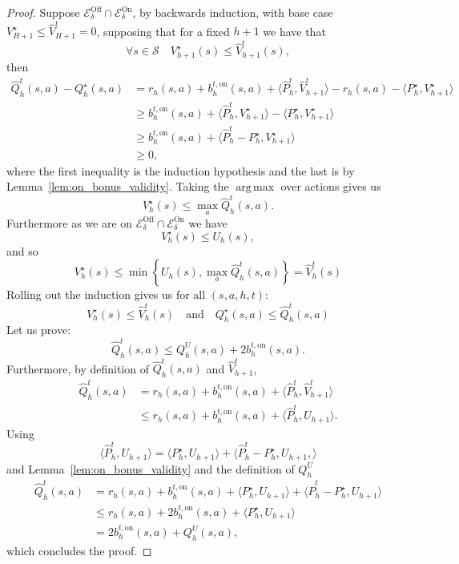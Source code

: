 \documentclass[twoside]{article}
\DeclareMathOperator*{\argmax}{arg\,max}
\newcommand{\on}{\mathrm{on}} %
\newcommand{\bont}{b_h^{t,\on}} %
\newcommand{\highv}{U} %
\begin{document}
\begin{proof}
    Suppose $\mathcal{E}^{\mathrm{Off}}_\delta\cap \mathcal{E}^{\mathrm{On}}_\delta$, by backwards induction, with base case $V_{H+1}^\star \le \widehat{V}_{H+1}^t = 0$, supposing that for a fixed $h+1$ we have that 
    \[
    \forall s \in \mathcal{S} \quad V_{h+1}^\star(s) \le \widehat{V}_{h+1}^t(s), 
    \]
    then 
    \begin{align*}
        \widehat{Q}^t_h(s,a) - Q^{\star}_h(s,a) & = r_h(s,a) + \bont(s,a) + \langle \widehat{P}^t_h, \widehat{V}^t_{h+1} \rangle - r_h(s,a) - \langle P^{\star}_h, V^{\star}_{h+1} \rangle \\
        & \geq  \bont(s,a) + \langle \widehat{P}^t_h, V^{\star}_{h+1}\rangle - \langle P^{\star}_h, V^{\star}_{h+1} \rangle \\
        & \geq \bont(s,a) +\langle \widehat{P}^t_h - P^{\star}_h, V^{\star}_{h+1}\rangle \\
        & \geq 0,
    \end{align*}
    where the first inequality is the induction hypothesis and the last is by Lemma~\ref{lem:on_bonus_validity}. Taking the $\argmax$ over actions gives us 
    \[ V^{\star}_h(s) \leq \max_a \widehat{Q}^t_h(s,a).\]
    Furthermore as we are on $\mathcal{E}^{\mathrm{Off}}_\delta\cap \mathcal{E}^{\mathrm{On}}_\delta$ we have 
    \[ V^{\star}_h(s) \leq \highv_{h}(s),\]
    and so 
    \[ V^{\star}_h(s) \leq  \min \left \lbrace \highv_{h}(s),\max_a  
    \widehat{Q}^t_h(s,a)\right \rbrace = \widehat{V}^t_h(s)\]
    Rolling out the induction gives us for all $(s,a,h,t)$:
    \[
    V_h^\star(s) \le \widehat{V}_h^t(s) \quad \text{and} \quad Q_h^\star(s,a) \le \widehat{Q}_h^t(s,a)
    \]
Let us prove: 
\[
\widehat{Q}_h^t(s,a) \le Q_h^{\highv}(s,a)+2 \bont(s,a).
\] 
Furthermore, by definition of $\widehat{Q}_h^t(s,a)$ and $\widehat{V}^t_{h+1}$,
\begin{align*}
    \widehat{Q}_h^t(s,a) & = r_h(s,a) + \bont(s,a) + \langle \widehat{P}^t_h , \widehat{V}^t_{h+1} \rangle \\
    & \leq  r_h(s,a) + \bont(s,a) + \langle \widehat{P}^t_h , \highv_{h+1} \rangle.
\end{align*}
Using 
\[\langle \widehat{P}^t_h , \highv_{h+1} \rangle = \langle P^{\star}_h , \highv_{h+1} \rangle + \langle \widehat{P}^t_h - P^{\star}_h , \highv_{h+1}, \rangle\] and Lemma~\ref{lem:on_bonus_validity} and the definition of $Q_h^{\highv}$
\begin{align*}
    \widehat{Q}_h^t(s,a) &= r_h(s,a) + \bont(s,a) + \langle P^{\star}_h , \highv_{h+1} \rangle + \langle \widehat{P}^t_h - P^{\star}_h , \highv_{h+1} \rangle \\
    &\leq r_h(s,a) + 2 \bont(s,a) + \langle P^{\star}_h , \highv_{h+1} \rangle \\
    &= 2 \bont(s,a) + Q_h^{\highv}(s,a),
\end{align*}
which concludes the proof.
\end{proof}
\end{document}
